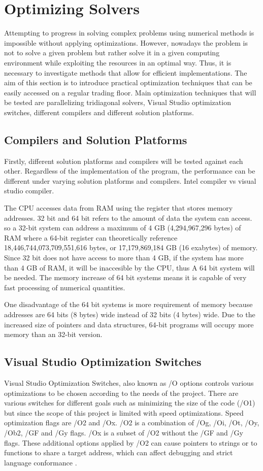 \documentclass[12pt, oneside]{book}
\theoremstyle{plain}
\theoremstyle{definition}
\begin{document}
\chapter{Optimizing Solvers}

Attempting to progress in solving complex problems using numerical methods is impossible without applying optimizations. However, nowadays the problem is not to solve a given problem but rather solve it in a given computing environment while exploiting the resources in an optimal way. Thus, it is necessary to investigate methods that allow for efficient implementations. The aim of this section is to introduce practical optimization techniques that can be easily accessed on a regular trading floor. Main optimization techniques that will be tested are parallelizing tridiagonal solvers, Visual Studio optimization switches, different compilers and different solution platforms.

\section{Compilers and Solution Platforms}
Firstly, different solution platforms and compilers will be tested against each other.
Regardless of the implementation of the program, the performance can be different under varying solution platforms and compilers.  
Intel compiler vs visual studio compiler.

The CPU accesses data from RAM using the register that stores memory addresses. 32 bit and 64 bit refers to the amount of data the system can access. so a 32-bit system can address a maximum of 4 GB (4,294,967,296 bytes) of RAM where a 64-bit register can theoretically reference 18,446,744,073,709,551,616 bytes, or 17,179,869,184 GB (16 exabytes) of memory. Since 32 bit does not have access to more than 4 GB, if the system has more than 4 GB of RAM, it will be inaccesible by the CPU, thus A 64 bit system will be needed. The memory increase of 64 bit systems means it is capable of very fast processing of numerical quantities.

One disadvantage of the 64 bit systems is more requirement of memory because addresses are 64 bits (8 bytes) wide instead of 32 bits (4 bytes) wide. Due to the increased size of pointers and data structures, 64-bit programs will occupy more memory than an 32-bit version.

\section{Visual Studio Optimization Switches}
Visual Studio Optimization Switches, also known as /O options controls various optimizations to be chosen according to the needs of the project. There are various switches for different goals such as minimizing the size of the code (/O1) but since the scope of this project is limited with speed optimizations. Speed optimization flags are /O2 and /Ox. /O2 is a combination of /Og, /Oi, /Ot, /Oy, /Ob2, /GF and /Gy flags. /Ox is a subset of /O2 without the  /GF and /Gy flags. These additional options applied by /O2 can cause pointers to strings or to functions to share a target address, which can affect debugging and strict language conformance  \cite{vsopt}. 
\end{document}

